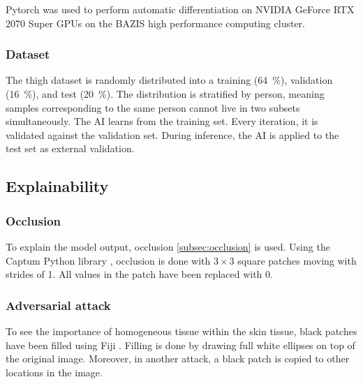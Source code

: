 Pytorch \cite{Paszke2019} was used to perform automatic differentiation on NVIDIA GeForce RTX 2070 Super GPUs on the BAZIS high performance computing cluster.

\subsubsection{Dataset}\label{subsec:skin_dataset}
The thigh dataset is randomly distributed into a training (\qty{64}{\percent}), validation (\qty{16}{\percent}), and test (\qty{20}{\percent}).
The distribution is stratified by person, meaning samples corresponding to the same person cannot live in two subsets simultaneously.
The AI learns from the training set.
Every iteration, it is validated against the validation set.
During inference, the AI is applied to the test set as external validation.


\subsection{Explainability}

\subsubsection{Occlusion}
To explain the model output, occlusion \cref{subsec:occlusion} is used.
Using the Captum Python library \cite{Kokhlikyan2020}, occlusion is done with $3\times3$ square patches moving with strides of 1.
All values in the patch have been replaced with 0.

\subsubsection{Adversarial attack}
To see the importance of homogeneous tissue within the skin tissue, black patches have been filled using Fiji \cite{Schindelin2012}.
Filling is done by drawing full white ellipses on top of the original image.
Moreover, in another attack, a black patch is copied to other locations in the image.
